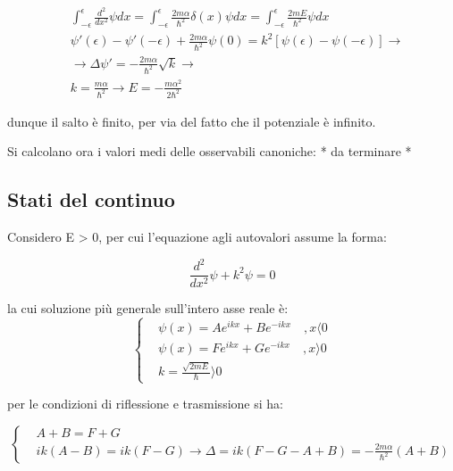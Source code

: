\documentclass{article}
\begin{document}
\begin{equation}
  \begin{aligned}
     & \int_{-\epsilon}^{\epsilon} \frac{d^2}{dx^2} \psi dx = \int_{-\epsilon}^{\epsilon}\frac{2m\alpha}{\hbar^2}\delta(x)\psi dx= \int_{-\epsilon}^{\epsilon} \frac{2mE}{\hbar^2}\psi dx \\
     & \psi'(\epsilon)-\psi'(-\epsilon)+\frac{2m\alpha}{\hbar^2}\psi(0)=k^2[\psi(\epsilon)- \psi(-\epsilon)] \rightarrow                                                                  \\
     & \rightarrow \Delta \psi'= -\frac{2m\alpha}{\hbar^2}\sqrt{k} \rightarrow                                                                                                            \\
     & k= \frac{m\alpha}{\hbar^2} \rightarrow E=-\frac{m\alpha^2}{2\hbar^2}
  \end{aligned}
\end{equation}

dunque il salto è finito, per via del fatto che il potenziale è infinito.

Si calcolano ora i valori medi delle osservabili canoniche: * da terminare *

\subsection{Stati del continuo}
Considero E > 0, per cui l'equazione agli autovalori assume la forma:

\begin{equation}
  \frac{d^2}{dx^2} \psi+k^2\psi=0
\end{equation}

la cui soluzione più generale sull'intero asse reale è:
\begin{equation}
  \left\{
  \begin{aligned}
     & \psi(x)=Ae^{ikx}+Be^{-ikx} \quad , x\langle 0 \\
     & \psi(x)=Fe^{ikx}+Ge^{-ikx} \quad , x\rangle 0 \\
     & k=\frac{\sqrt{2mE}}{\hbar}\rangle 0
  \end{aligned}
  \right.
\end{equation}

per le condizioni di riflessione e trasmissione si ha:

\begin{equation}
  \left\{
  \begin{aligned}
     & A+B=F+G                                                                        \\
     & ik(A-B)=ik(F-G) \rightarrow \Delta= ik(F-G-A+B)=-\frac{2m\alpha}{\hbar^2}(A+B)
  \end{aligned}
  \right.
\end{equation}
\end{document}
